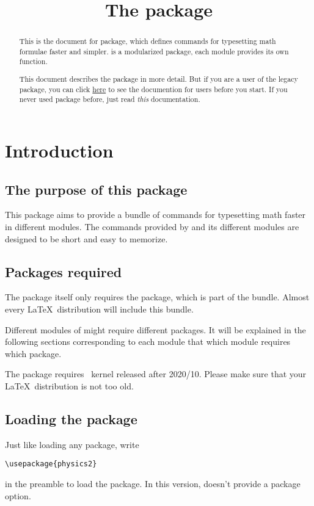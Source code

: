 \documentclass[11pt,letterpaper]{article}
\title{The \pkg{physics2} package}
\begin{document}
\maketitle

\begin{abstract}
This is the document for  package, which defines commands for
typesetting math formulae faster and simpler.  is a modularized
package, each module provides its own function. 

This document describes the  package in more detail.
But if you are a user of the legacy  package, you can click
\hyperref{./physics2-legacy.pdf}{}{}{here} to see the documention for
 users before you start. If you never used  package
before, just read \emph{this} documentation.
\end{abstract}

\tableofcontents

\section{Introduction}
\subsection{The purpose of this package}
This package aims to provide a bundle of commands for typesetting math faster
in different modules. The commands provided by  and its different
modules are designed to be short and easy to memorize.

\subsection{Packages required}
The  package itself only requires the  package, which
is part of the  bundle. Almost every \LaTeX\ distribution
will include this bundle.

Different modules of  might require different packages. It will
be explained in the following sections corresponding to each module that which
module requires which package.

The  package requires \LaTeXe\ kernel released after 2020/10.
Please make sure that your \LaTeX\ distribution is not too old.

\subsection{Loading the  package}
Just like loading any package, write
\begin{Verbatim}
\usepackage{physics2}
\end{Verbatim}
in the preamble to load the  package. In this version,
 doesn't provide a package option.
\end{document}
